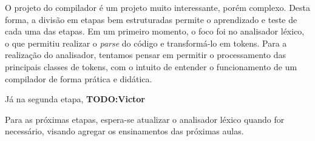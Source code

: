 
O projeto do compilador é um projeto muito interessante, porém complexo. Desta forma, a divisão em etapas bem estruturadas permite o aprendizado e teste de cada uma das etapas. Em um primeiro momento, o foco foi no analisador léxico, o que permitiu realizar o \emph{parse} do código e transformá-lo em tokens. Para a realização do analisador, tentamos pensar em permitir o processamento das principais classes de tokens, com o intuito de entender o funcionamento de um compilador de forma prática e didática.

Já na segunda etapa, \textbf{TODO:Victor}

Para as próximas etapas, espera-se atualizar o analisador léxico quando for necessário, visando agregar os ensinamentos das próximas aulas.
